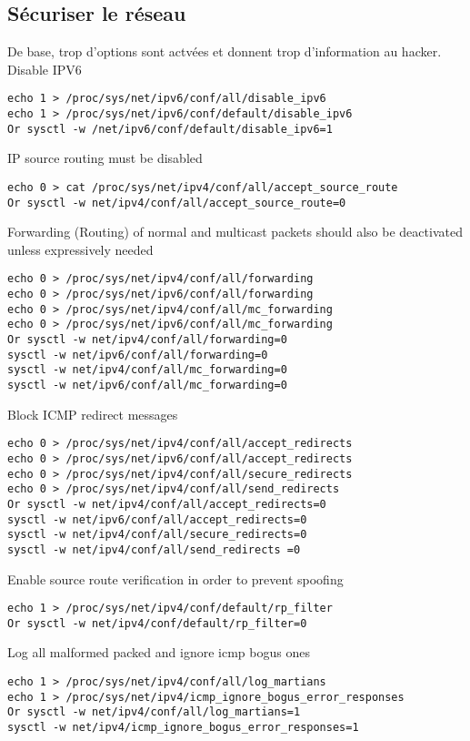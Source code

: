 \subsection{Sécuriser le réseau}
De base, trop d'options sont actvées et donnent trop d'information au hacker. \\
Disable IPV6
\begin{Verbatim}[breaklines=true, breakanywhere=true]
echo 1 > /proc/sys/net/ipv6/conf/all/disable_ipv6
echo 1 > /proc/sys/net/ipv6/conf/default/disable_ipv6
Or sysctl -w /net/ipv6/conf/default/disable_ipv6=1
\end{Verbatim}
IP source routing must be disabled
\begin{Verbatim}[breaklines=true, breakanywhere=true]
echo 0 > cat /proc/sys/net/ipv4/conf/all/accept_source_route
Or sysctl -w net/ipv4/conf/all/accept_source_route=0
\end{Verbatim}
Forwarding (Routing) of normal and multicast packets should also be deactivated unless 
expressively needed
\begin{Verbatim}[breaklines=true, breakanywhere=true]
echo 0 > /proc/sys/net/ipv4/conf/all/forwarding
echo 0 > /proc/sys/net/ipv6/conf/all/forwarding
echo 0 > /proc/sys/net/ipv4/conf/all/mc_forwarding
echo 0 > /proc/sys/net/ipv6/conf/all/mc_forwarding
Or sysctl -w net/ipv4/conf/all/forwarding=0
sysctl -w net/ipv6/conf/all/forwarding=0
sysctl -w net/ipv4/conf/all/mc_forwarding=0
sysctl -w net/ipv6/conf/all/mc_forwarding=0
\end{Verbatim}
Block ICMP redirect messages
\begin{Verbatim}[breaklines=true, breakanywhere=true]
echo 0 > /proc/sys/net/ipv4/conf/all/accept_redirects
echo 0 > /proc/sys/net/ipv6/conf/all/accept_redirects
echo 0 > /proc/sys/net/ipv4/conf/all/secure_redirects
echo 0 > /proc/sys/net/ipv4/conf/all/send_redirects
Or sysctl -w net/ipv4/conf/all/accept_redirects=0
sysctl -w net/ipv6/conf/all/accept_redirects=0
sysctl -w net/ipv4/conf/all/secure_redirects=0
sysctl -w net/ipv4/conf/all/send_redirects =0
\end{Verbatim}
Enable source route verification in order to prevent spoofing
\begin{Verbatim}[breaklines=true, breakanywhere=true]
echo 1 > /proc/sys/net/ipv4/conf/default/rp_filter
Or sysctl -w net/ipv4/conf/default/rp_filter=0
\end{Verbatim}
Log all malformed packed and ignore icmp bogus ones
\begin{Verbatim}[breaklines=true, breakanywhere=true]
echo 1 > /proc/sys/net/ipv4/conf/all/log_martians
echo 1 > /proc/sys/net/ipv4/icmp_ignore_bogus_error_responses
Or sysctl -w net/ipv4/conf/all/log_martians=1
sysctl -w net/ipv4/icmp_ignore_bogus_error_responses=1
\end{Verbatim}
